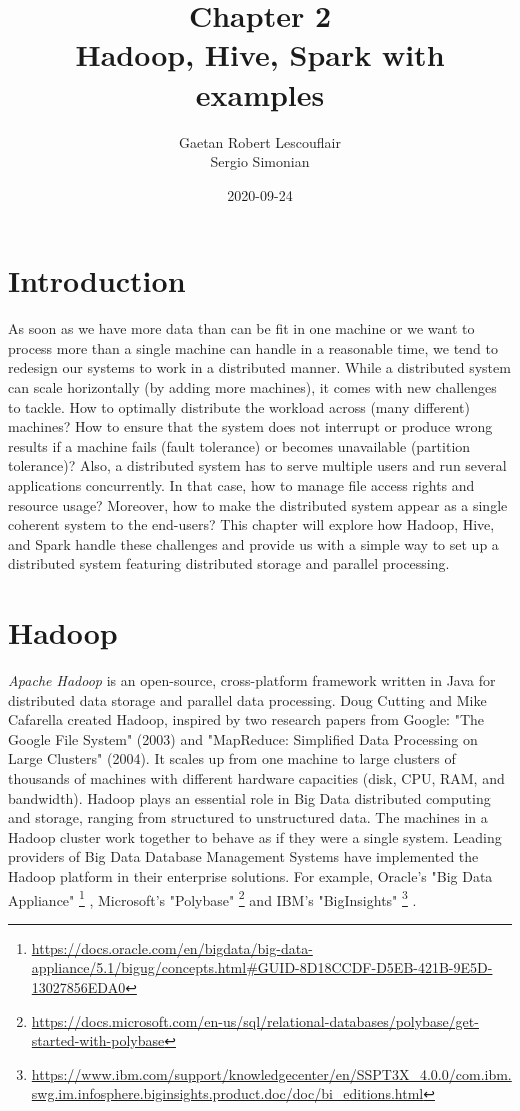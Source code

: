 \documentclass[12pt,english]{book}
\title{Chapter 2\\Hadoop, Hive, Spark with examples}
\date{2020-09-24}
\author{Gaetan Robert Lescouflair\\Sergio Simonian}
\begin{document}
\maketitle
\newpage
{}
\setcounter{chapter}{2}
\setcounter{secnumdepth}{3}	
\setlength\arrayrulewidth{1pt}

\section{Introduction}


As soon as we have more data than can be fit in one machine or we want to process more than a single machine can handle in a reasonable time, we tend to redesign our systems to work in a distributed manner.
While a distributed system can scale horizontally (by adding more machines), it comes with new challenges to tackle.
How to optimally distribute the workload across (many different) machines?
How to ensure that the system does not interrupt or produce wrong results if a machine fails (fault tolerance) or becomes unavailable (partition tolerance)?
Also, a distributed system has to serve multiple users and run several applications concurrently.
In that case, how to manage file access rights and resource usage?
Moreover, how to make the distributed system appear as a single coherent system to the end-users?
This chapter will explore how Hadoop, Hive, and Spark handle these challenges and provide us with a simple way to set up a distributed system featuring distributed storage and parallel processing.
 

\section{Hadoop}


\emph{Apache Hadoop} is an open-source, cross-platform framework written in Java for distributed data storage and parallel data processing.
Doug Cutting and Mike Cafarella created Hadoop, inspired by two research papers from Google: "The Google File System" (2003) and "MapReduce: Simplified Data Processing on Large Clusters" (2004).
It scales up from one machine to large clusters of thousands of machines with different hardware capacities (disk, CPU, RAM, and bandwidth).
Hadoop plays an essential role in Big Data distributed computing and storage, ranging from structured to unstructured data.
The machines in a Hadoop cluster work together to behave as if they were a single system.
Leading providers of Big Data Database Management Systems have implemented the Hadoop platform in their enterprise solutions.
For example, Oracle's "Big Data Appliance"
\footnote{\url{https://docs.oracle.com/en/bigdata/big-data-appliance/5.1/bigug/concepts.html\#GUID-8D18CCDF-D5EB-421B-9E5D-13027856EDA0}}
, Microsoft's "Polybase"
\footnote{\url{https://docs.microsoft.com/en-us/sql/relational-databases/polybase/get-started-with-polybase}}
and IBM's "BigInsights" 
\footnote{\url{https://www.ibm.com/support/knowledgecenter/en/SSPT3X\_4.0.0/com.ibm.swg.im.infosphere.biginsights.product.doc/doc/bi\_editions.html}}
.
\end{document}
